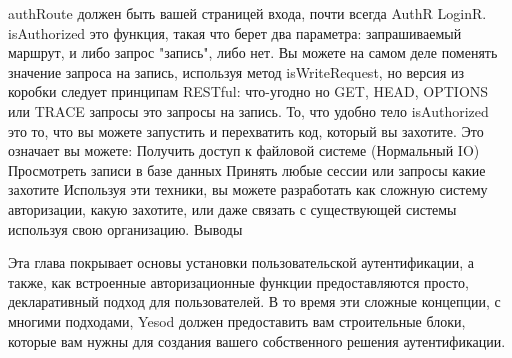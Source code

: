 authRoute должен быть вашей страницей входа, почти всегда AuthR LoginR. isAuthorized это функция, такая что берет два параметра: запрашиваемый маршрут, и либо запрос "запись", либо нет. Вы можете на самом деле поменять значение запроса на запись, используя метод isWriteRequest, но версия из коробки следует принципам RESTful: что-угодно но GET, HEAD, OPTIONS или TRACE запросы это запросы на запись.
То, что удобно тело isAuthorized это то, что вы можете запустить и перехватить код, который вы захотите. Это означает вы можете:
Получить доступ к файловой системе (Нормальный IO)
Просмотреть записи в базе данных
Принять любые сессии или запросы какие захотите
Используя эти техники, вы можете разработать как сложную систему авторизации, какую захотите, или даже связать с существующей системы используя свою организацию.
Выводы

Эта глава покрывает основы установки пользовательской аутентификации, а также, как встроенные авторизационные функции предоставляются просто, декларативный подход для пользователей. В то время эти сложные концепции, с многими подходами, Yesod должен предоставить вам строительные блоки, которые вам нужны для создания вашего собственного решения аутентификации.